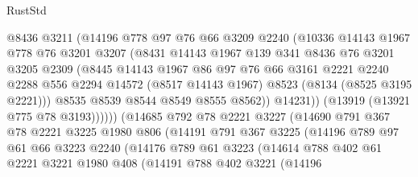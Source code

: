 \begin{lexlean}{RustStd}
\begin{coremodule}
{\begin{coremodule}
{{{{{{{{{{{{{{{{{{{{{{{{{{{{{{{{{{{{{{{{{{{{{{{{{{{{{                    @8436
                    @3211
                    (@14196
                      @778
                      @97
                      @76
                      @66
                      @3209
                      @2240
                      (@10336
                        @14143
                        @1967
                        @778
                        @76
                        @3201
                        @3207
                        (@8431
                          @14143
                          @1967
                          @139
                          @341
                          @8436
                          @76
                          @3201
                          @3205
                          @2309
                          (@8445
                            @14143
                            @1967
                            @86
                            @97
                            @76
                            @66
                            @3161
                            @2221
                            @2240
                            @2288
                            @556
                            @2294
                            @14572
                            (@8517 @14143 @1967)
                            @8523
                            (@8134 (@8525 @3195 @2221)))
                          @8535
                          @8539
                          @8544
                          @8549
                          @8555
                          @8562))
                      @14231))
                  (@13919 (@13921 @775 @78 @3193))))))
          (@14685
            @792
            @78
            @2221
            @3227
            (@14690
              @791
              @367
              @78
              @2221
              @3225
              @1980
              @806
              (@14191
                @791
                @367
                @3225
                (@14196
                  @789
                  @97
                  @61
                  @66
                  @3223
                  @2240
                  (@14176
                    @789
                    @61
                    @3223
                    (@14614
                      @788
                      @402
                      @61
                      @2221
                      @3221
                      @1980
                      @408
                      (@14191
                        @788
                        @402
                        @3221
                        (@14196
}}}}}}}}}}}}}}}}}}}}}}}}}}}}}}}}}}}}}}}}}}}}}}}}}}}}}
\end{coremodule}}
\end{coremodule}
\end{lexlean}
